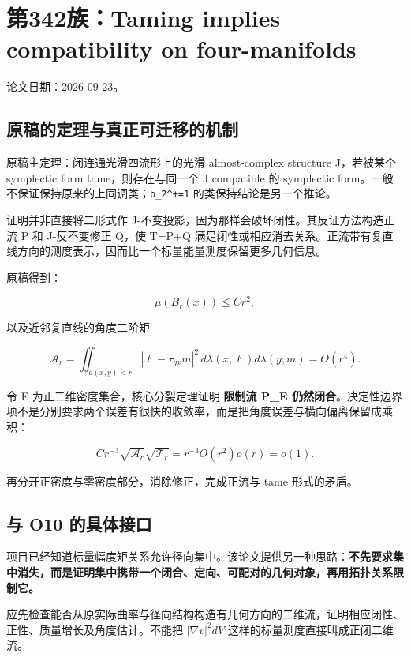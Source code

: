 \documentclass[UTF8,11pt,openany,oneside,fontset=none]{ctexbook}
\begin{document}
\section{第342族：Taming implies compatibility on four-manifolds}\label{ch6:ux7b2c342ux65cftaming-implies-compatibility-on-four-manifolds}

论文日期：2026-09-23。\cite{OAI342}

\subsection{原稿的定理与真正可迁移的机制}\label{ch6:ux539fux7a3fux7684ux5b9aux7406ux4e0eux771fux6b63ux53efux8fc1ux79fbux7684ux673aux5236}

原稿主定理：闭连通光滑四流形上的光滑 almost-complex structure J，若被某个 symplectic form tame，则存在与同一个 J compatible 的 symplectic form。一般不保证保持原来的上同调类；\texttt{b\_2\^{}+=1} 的类保持结论是另一个推论。

证明并非直接将二形式作 J-不变投影，因为那样会破坏闭性。其反证方法构造正流 P 和 J-反不变修正 Q，使 T=P+Q 满足闭性或相应消去关系。正流带有复直线方向的测度表示，因而比一个标量能量测度保留更多几何信息。

原稿得到：

\[
\mu(B_r(x))\le Cr^2,
\]

以及近邻复直线的角度二阶矩

\[
\mathcal A_r=\iint_{d(x,y)<r}|\ell-\tau_{yx}m|^2\,d\lambda(x,\ell)d\lambda(y,m)
=O(r^4).
\]

令 E 为正二维密度集合，核心分裂定理证明 \textbf{限制流 P\_E 仍然闭合}。决定性边界项不是分别要求两个误差有很快的收敛率，而是把角度误差与横向偏离保留成乘积：

\[
Cr^{-3}\sqrt{\mathcal A_r}\sqrt{\mathcal T_r}
=r^{-3}O(r^2)o(r)=o(1).
\]

再分开正密度与零密度部分，消除修正，完成正流与 tame 形式的矛盾。

\subsection{与 O10 的具体接口}\label{ch6:ux4e0e-o10-ux7684ux5177ux4f53ux63a5ux53e3}

项目已经知道标量幅度矩关系允许径向集中。该论文提供另一种思路：\textbf{不先要求集中消失，而是证明集中携带一个闭合、定向、可配对的几何对象，再用拓扑关系限制它。}

应先检查能否从原实际曲率与径向结构构造有几何方向的二维流，证明相应闭性、正性、质量增长及角度估计。不能把 \(|\nabla v|^2dV\) 这样的标量测度直接叫成正闭二维流。
\end{document}
